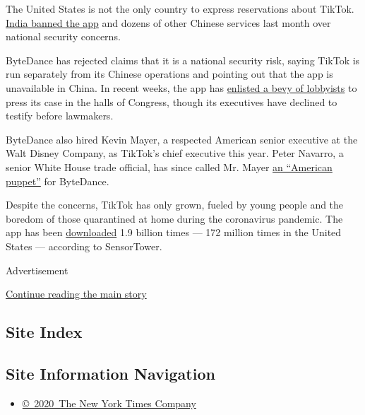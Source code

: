 The United States is not the only country to express reservations about
TikTok.
\href{https://www.nytimes3xbfgragh.onion/2020/06/29/world/asia/tik-tok-banned-india-china.html}{India
banned the app} and dozens of other Chinese services last month over
national security concerns.

ByteDance has rejected claims that it is a national security risk,
saying TikTok is run separately from its Chinese operations and pointing
out that the app is unavailable in China. In recent weeks, the app has
\href{https://www.nytimes3xbfgragh.onion/2020/07/15/technology/tiktok-washington-lobbyist.html}{enlisted
a bevy of lobbyists} to press its case in the halls of Congress, though
its executives have declined to testify before lawmakers.

ByteDance also hired Kevin Mayer, a respected American senior executive
at the Walt Disney Company, as TikTok's chief executive this year. Peter
Navarro, a senior White House trade official, has since called Mr. Mayer
\href{https://www.cnbc.com/2020/07/13/trump-advisor-navarro-calls-tiktok-ceo-kevin-mayer-an-american-puppet.html}{an
``American puppet''} for ByteDance.

Despite the concerns, TikTok has only grown, fueled by young people and
the boredom of those quarantined at home during the coronavirus
pandemic. The app has been
\href{https://www.nytimes3xbfgragh.onion/2020/05/18/business/media/tiktok-ceo-kevin-mayer.html}{downloaded}
1.9 billion times --- 172 million times in the United States ---
according to SensorTower.

Advertisement

\protect\hyperlink{after-bottom}{Continue reading the main story}

\hypertarget{site-index}{%
\subsection{Site Index}\label{site-index}}

\hypertarget{site-information-navigation}{%
\subsection{Site Information
Navigation}\label{site-information-navigation}}

\begin{itemize}
\tightlist
\item
  \href{https://help.nytimes3xbfgragh.onion/hc/en-us/articles/115014792127-Copyright-notice}{©~2020~The
  New York Times Company}
\end{itemize}

